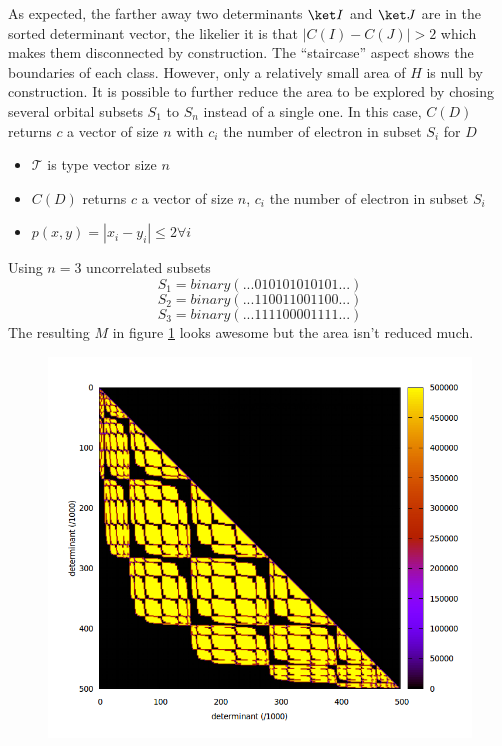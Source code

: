As expected, the farther away two determinants $\ket I$ and $\ket J$ are in the sorted determinant vector, the likelier it is that $|C(I)-C(J)| > 2$ which makes them disconnected by construction. The ``staircase'' aspect shows the boundaries of each class.
However, only a relatively small area of $H$ is null by construction. It is possible to further reduce the area to be explored by chosing several orbital subsets $S_1$ to $S_n$ instead of a single one. In this case, $C(D)$ returns $c$ a vector of size $n$ with $c_{i}$ the number of electron in subset $S_i$ for $D$

\begin{itemize}
	\item
	$\mathcal{T}$ is type vector size $n$
	\item
	$C(D)$ returns $c$ a vector of size $n$, $c_i$ the number of electron in subset $S_i$
	\item
	$p(x, y) = |x_i - y_i| \leq 2 \forall i$
\end{itemize}



Using $n=3$ uncorrelated subsets
\begin{equation}
S_1 = binary(...010101010101...)
\end{equation}
\begin{equation}
S_2 = binary(...110011001100...)
\end{equation}
\begin{equation}
S_3 = binary(...111100001111...)
\end{equation}
The resulting $M$ in figure \ref{fig:num_subspace3} looks awesome but the area isn't reduced much.

\begin{figure}[h!]
	\begin{center}
		\includegraphics[width=0.6\columnwidth]{figures/davidson/num_subspace3}
		\caption{{\label{fig:num_subspace3}
		}}
	\end{center}
\end{figure}


